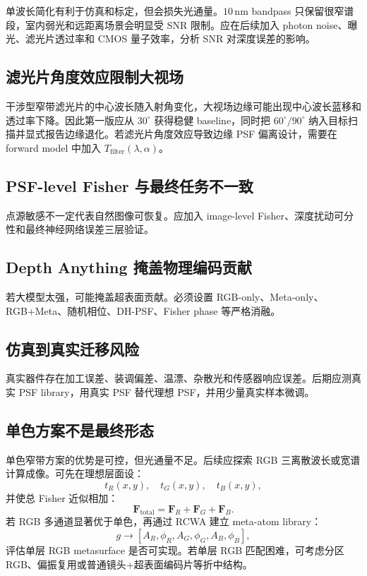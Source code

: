 \documentclass[11pt,a4paper,fontset=none]{ctexart}
\begin{document}
单波长简化有利于仿真和标定，但会损失光通量。$10\,\mathrm{nm}$ bandpass 只保留很窄谱段，室内弱光和远距离场景会明显受 SNR 限制。应在后续加入 photon noise、曝光、滤光片透过率和 CMOS 量子效率，分析 SNR 对深度误差的影响。

\subsection{滤光片角度效应限制大视场}

干涉型窄带滤光片的中心波长随入射角变化，大视场边缘可能出现中心波长蓝移和透过率下降。因此第一版应从 $30^\circ$ 获得稳健 baseline，同时把 $60^\circ/90^\circ$ 纳入目标扫描并显式报告边缘退化。若滤光片角度效应导致边缘 PSF 偏离设计，需要在 forward model 中加入 $T_{\mathrm{filter}}(\lambda,\alpha)$。

\subsection{PSF-level Fisher 与最终任务不一致}

点源敏感不一定代表自然图像可恢复。应加入 image-level Fisher、深度扰动可分性和最终神经网络误差三层验证。

\subsection{Depth Anything 掩盖物理编码贡献}

若大模型太强，可能掩盖超表面贡献。必须设置 RGB-only、Meta-only、RGB+Meta、随机相位、DH-PSF、Fisher phase 等严格消融。

\subsection{仿真到真实迁移风险}

真实器件存在加工误差、装调偏差、温漂、杂散光和传感器响应误差。后期应测真实 PSF library，用真实 PSF 替代理想 PSF，并用少量真实样本微调。

\subsection{单色方案不是最终形态}

单色窄带方案的优势是可控，但光通量不足。后续应探索 RGB 三离散波长或宽谱计算成像。可先在理想层面设：
\begin{equation}
  t_R(x,y),\quad t_G(x,y),\quad t_B(x,y),
\end{equation}
并使总 Fisher 近似相加：
\begin{equation}
  \bm F_{\mathrm{total}}
  =
  \bm F_R+\bm F_G+\bm F_B.
\end{equation}
若 RGB 多通道显著优于单色，再通过 RCWA 建立 meta-atom library：
\begin{equation}
  g\rightarrow
  [A_R,\phi_R,A_G,\phi_G,A_B,\phi_B],
\end{equation}
评估单层 RGB metasurface 是否可实现。若单层 RGB 匹配困难，可考虑分区 RGB、偏振复用或普通镜头+超表面编码片等折中结构。
\end{document}
